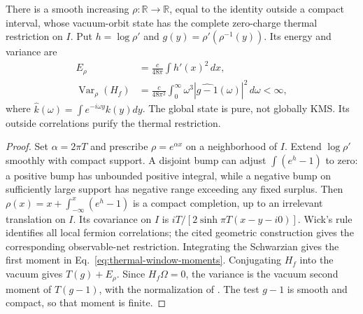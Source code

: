 \begin{proposition}
\label{prop:finite-thermal-window}
There is a smooth increasing $\rho:\mathbb R\to\mathbb R$, equal to
the identity outside a compact interval, whose vacuum-orbit state has
the complete zero-charge thermal restriction on $I$. Put
$h=\log\rho'$ and $g(y)=\rho'(\rho^{-1}(y))$. Its energy and variance are
\begin{align}
 E_\rho&=\frac{c}{48\pi}\int h'(x)^2\,dx,\nonumber\\
 \operatorname{Var}_\rho(H_f)&=
  \frac{c}{48\pi^2}\int_0^\infty
     \omega^3|\widehat{g-1}(\omega)|^2\,d\omega<\infty,
                 \label{eq:thermal-window-moments}
\end{align}
where $\widehat k(\omega)=\int e^{-i\omega y}k(y)dy$.
The global state is pure, not globally KMS. Its outside correlations
purify the thermal restriction.
\end{proposition}
\begin{proof}
Set $\alpha=2\pi T$ and prescribe $\rho=e^{\alpha x}$ on a
neighborhood of $I$. Extend $\log\rho'$ smoothly with compact support.
A disjoint bump can adjust $\int(e^h-1)$ to zero: a positive bump
has unbounded positive integral, while a negative bump on sufficiently
large support has negative range exceeding any fixed surplus.
Then $\rho(x)=x+\int_{-\infty}^x(e^h-1)$ is a compact completion,
up to an irrelevant translation on $I$.
Its covariance on $I$ is $iT/[2\sinh\pi T(x-y-i0)]$.
Wick's rule identifies all local fermion correlations; the cited
geometric construction gives the corresponding observable-net restriction.
Integrating the Schwarzian gives the first moment in
Eq.~\eqref{eq:thermal-window-moments}. Conjugating $H_f$ into the
vacuum gives $T(g)+E_\rho$. Since $H_f\Omega=0$, the variance is the
vacuum second moment of $T(g-1)$, with the normalization of
\cite[Eq.~(4.11)]{FewsterHollands2019}.
The test $g-1$ is smooth and compact, so that moment is finite.
\end{proof}

